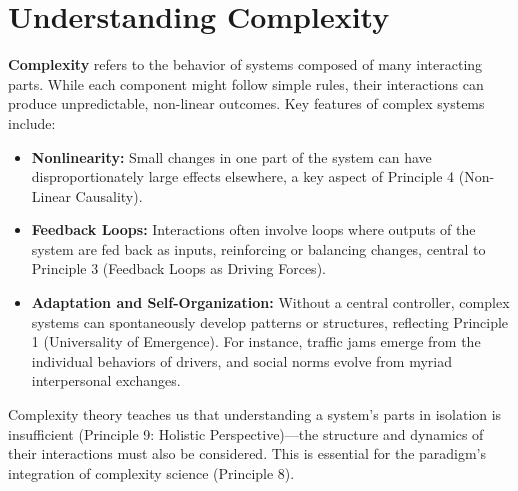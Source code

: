\section*{Understanding Complexity}
\textbf{Complexity} refers to the behavior of systems composed of many interacting parts. While each component might follow simple rules, their interactions can produce unpredictable, non-linear outcomes. Key features of complex systems include:
\begin{itemize}
    \item \textbf{Nonlinearity:} Small changes in one part of the system can have disproportionately large effects elsewhere, a key aspect of Principle 4 (Non-Linear Causality).
    \item \textbf{Feedback Loops:} Interactions often involve loops where outputs of the system are fed back as inputs, reinforcing or balancing changes, central to Principle 3 (Feedback Loops as Driving Forces).
    \item \textbf{Adaptation and Self-Organization:} Without a central controller, complex systems can spontaneously develop patterns or structures, reflecting Principle 1 (Universality of Emergence). For instance, traffic jams emerge from the individual behaviors of drivers, and social norms evolve from myriad interpersonal exchanges.
\end{itemize}
Complexity theory teaches us that understanding a system's parts in isolation is insufficient (Principle 9: Holistic Perspective)---the structure and dynamics of their interactions must also be considered. This is essential for the paradigm's integration of complexity science (Principle 8). %

